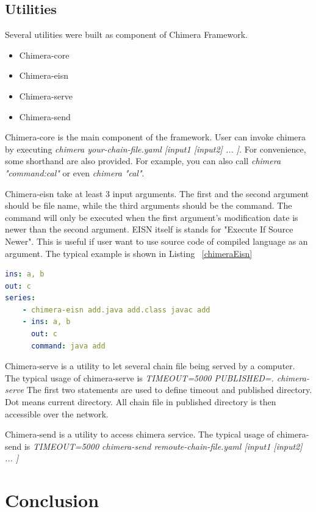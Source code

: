 \documentclass[conference]{IEEEtran}
\begin{document}
\subsection{Utilities}

Several utilities were built as component of Chimera Framework.

\begin{itemize}
    \item Chimera-core
    \item Chimera-eisn
    \item Chimera-serve
    \item Chimera-send
\end{itemize}

Chimera-core is the main component of the framework. User can invoke chimera by
executing {\it chimera your-chain-file.yaml [input1 [input2] ... ]}. For convenience,
some shorthand are also provided. For example, you can also call 
{\it chimera "command:cal"} or even {\it chimera "cal"}.

Chimera-eisn take at least 3 input arguments. The first and the second argument should
be file name, while the third arguments should be the command. The command will only
be executed when the first argument's modification date is newer than the second 
argument. EISN itself is stands for "Execute If Source Newer". This is useful if user
want to use source code of compiled language as an argument. 
The typical example is shown in Listing ~\ref{chimeraEisn}

\begin{lstlisting}[caption=Chimera-eisn usage example, label=chimeraEisn, language=yaml, basicstyle=\small, breaklines=true]
ins: a, b
out: c
series:
    - chimera-eisn add.java add.class javac add
    - ins: a, b
      out: c
      command: java add
\end{lstlisting}

Chimera-serve is a utility to let several chain file being served by a computer.
The typical usage of chimera-serve is {\it TIMEOUT=5000 PUBLISHED=. chimera-serve}
The first two statements are used to define timeout and published directory. Dot means
current directory. All chain file in published directory is then accessible over
the network.

Chimera-send is a utility to access chimera service.
The typical usage of chimera-send is {\it TIMEOUT=5000 chimera-send remoute-chain-file.yaml [input1 [input2] ... ]}

\section{Conclusion}
\end{document}
